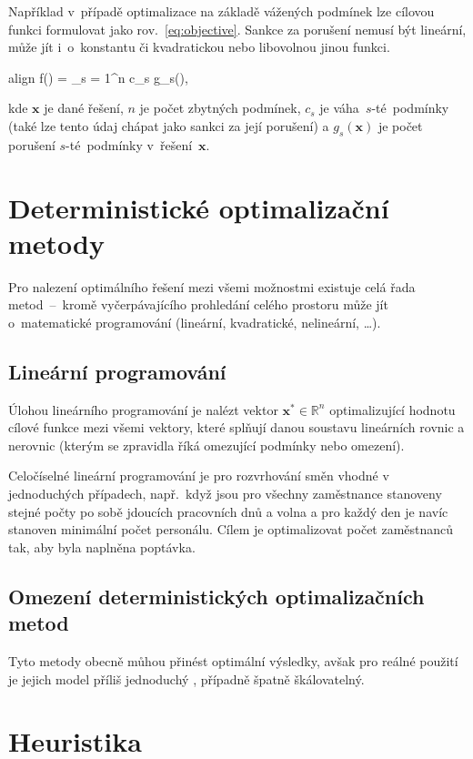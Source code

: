 \documentclass[a4paper,11pt,openany,twoside]{book}
\newcommand{\coloredeq}[2]{\begin{empheq}{align}\label{#1}\hspace{1em}#2\hspace{1em}\end{empheq}}
\begin{document}
Například v~případě optimalizace na základě vážených podmínek lze cílovou funkci formulovat jako rov.~\ref{eq:objective}. Sankce za porušení nemusí být lineární, může jít i~o~konstantu či kvadratickou nebo libovolnou jinou funkci. \cite{kletzander2020solving}
\coloredeq{eq:objective}{
	f() = \sum_{s = 1}^n c_s \cdot g_s(\boldsymbol{x}),
}
kde $\boldsymbol{x}$ je dané řešení, $n$ je počet zbytných podmínek, $c_s$ je váha~$s$-té~podmínky (také lze tento údaj chápat jako sankci za její porušení) a $g_s(\boldsymbol{x})$ je počet porušení $s$-té~podmínky v~řešení~$\boldsymbol{x}$. \cite{awadallah2015hybrid}


\section{Deterministické optimalizační metody}

Pro nalezení optimálního řešení mezi všemi možnostmi existuje celá řada metod~–~kromě vyčerpávajícího prohledání celého prostoru může jít o~matematické programování (lineární, kvadratické, nelineární, …).

\subsection{Lineární programování}

Úlohou lineárního programování je nalézt vektor $\boldsymbol{x}^{\ast} \in \mathbb{R}^n$ optimalizující hodnotu cílové funkce mezi všemi vektory, které splňují danou soustavu lineárních rovnic a nerovnic (kterým se zpravidla říká omezující podmínky nebo omezení). \cite{matousek2006linearni}

Celočíselné lineární programování je pro rozvrhování směn vhodné v jed\-no\-du\-chých případech, např.~když jsou pro všechny zaměstnance stanoveny stejné počty po sobě jdoucích pracovních dnů a volna a pro každý den je navíc stanoven minimální počet personálu. Cílem je optimalizovat počet zaměstnanců tak, aby byla naplněna poptávka. \cite{satheeshkumar2014linear}

\subsection{Omezení deterministických optimalizačních metod}
Tyto metody obecně můhou přinést optimální výsledky, avšak pro reálné použití je jejich model příliš jednoduchý \cite{burke2004state}, případně špatně škálovatelný.

\section{Heuristika}
\end{document}
